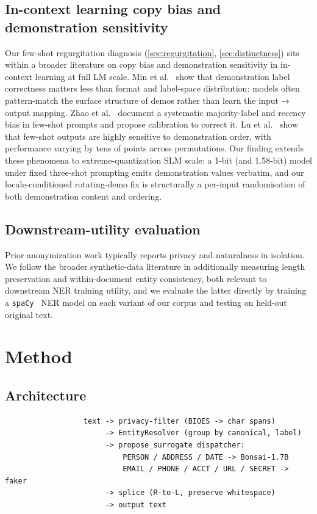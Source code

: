 \documentclass[11pt]{article}
\newcommand{\code}[1]{\texttt{#1}}
\newcommand{\spacy}{\code{spaCy}}
\begin{document}
\subsection{In-context learning copy bias and demonstration sensitivity}
Our few-shot regurgitation diagnosis (\cref{sec:regurgitation},
\cref{sec:distinctness}) sits within a broader literature on copy
bias and demonstration sensitivity in in-context learning at full LM
scale.
Min et al.~\cite{min2022rethinking} show that demonstration label
correctness matters less than format and label-space distribution:
models often pattern-match the surface structure of demos rather than
learn the input$\to$output mapping. Zhao et
al.~\cite{zhao2021calibrate} document a systematic majority-label and
recency bias in few-shot prompts and propose calibration to correct
it. Lu et al.~\cite{lu2022fantastically} show that few-shot outputs
are highly sensitive to demonstration order, with performance varying
by tens of points across permutations. Our finding extends these
phenomena to extreme-quantization SLM scale: a 1-bit (and 1.58-bit)
model under fixed three-shot prompting emits demonstration values
verbatim, and our locale-conditioned rotating-demo fix is
structurally a per-input randomisation of both demonstration content
and ordering.

\subsection{Downstream-utility evaluation}
Prior anonymization work typically reports privacy and naturalness in
isolation. We follow the broader synthetic-data literature in
additionally measuring length preservation and within-document entity
consistency, both relevant to downstream NER training utility, and we
evaluate the latter directly by training a \spacy{}~\cite{spacy} NER
model on each variant of our corpus and testing on held-out original
text.

\section{Method}
\label{sec:method}

\subsection{Architecture}
\label{sec:arch}

\begin{lstlisting}
                  text -> privacy-filter (BIOES -> char spans)
                       -> EntityResolver (group by canonical, label)
                       -> propose_surrogate dispatcher:
                           PERSON / ADDRESS / DATE -> Bonsai-1.7B
                           EMAIL / PHONE / ACCT / URL / SECRET -> faker
                       -> splice (R-to-L, preserve whitespace)
                       -> output text
\end{lstlisting}
\end{document}
